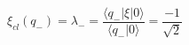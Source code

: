 \begin{equation}
\label{ximinus}
\xi_{cl}(q_-)=\lambda_-=\frac{\langle q_-|\xi|0 \rangle}{\langle q_-|0 
\rangle}
=\frac{-1}{\sqrt{2}}
\end{equation}

